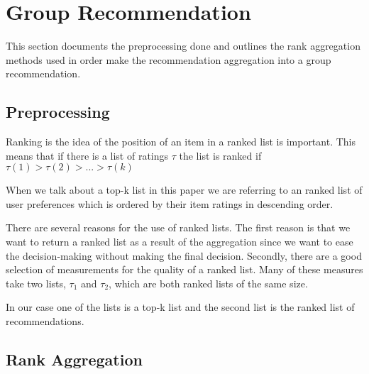 \section{Group Recommendation}\label{sec:grouprecommendation}
This section documents the preprocessing done and outlines the rank aggregation methods used in order make the recommendation aggregation into a group recommendation. 

\subsection{Preprocessing}
Ranking is the idea of the position of an item in a ranked list is important. This means that if there is a list of ratings $\tau$ the list is ranked if $\tau (1) > \tau (2) > ... > \tau (k)$

When we talk about a top-k list in this paper we are referring to an ranked list of user preferences which is ordered by their item ratings in descending order.

There are several reasons for the use of ranked lists. 
The first reason is that we want to return a ranked list as a result of the aggregation since we want to ease the decision-making without making the final decision.
Secondly, there are a good selection of measurements for the quality of a ranked list. Many of these measures take two lists, $\tau_1$ and $\tau_2$, which are both ranked lists of the same size. 

In our case one of the lists is a top-k list and the second list is the ranked list of recommendations.
\subsection{Rank Aggregation}\label{sec:aggregations}



